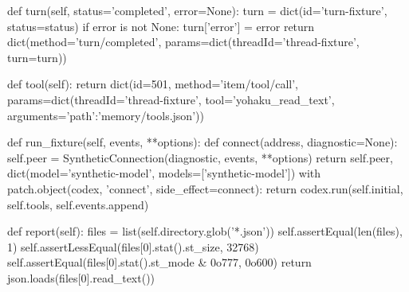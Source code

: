     def turn(self, status='completed', error=None):
        turn = dict(id='turn-fixture', status=status)
        if error is not None:
            turn['error'] = error
        return dict(method='turn/completed', params=dict(threadId='thread-fixture', turn=turn))

    def tool(self):
        return dict(id=501, method='item/tool/call', params=dict(threadId='thread-fixture',
                    tool='yohaku_read_text', arguments={'path':'memory/tools.json'}))

    def run_fixture(self, events, **options):
        def connect(address, diagnostic=None):
            self.peer = SyntheticConnection(diagnostic, events, **options)
            return self.peer, dict(model='synthetic-model', models=['synthetic-model'])
        with patch.object(codex, 'connect', side_effect=connect):
            return codex.run(self.initial, self.tools, self.events.append)

    def report(self):
        files = list(self.directory.glob('*.json'))
        self.assertEqual(len(files), 1)
        self.assertLessEqual(files[0].stat().st_size, 32768)
        self.assertEqual(files[0].stat().st_mode & 0o777, 0o600)
        return json.loads(files[0].read_text())

